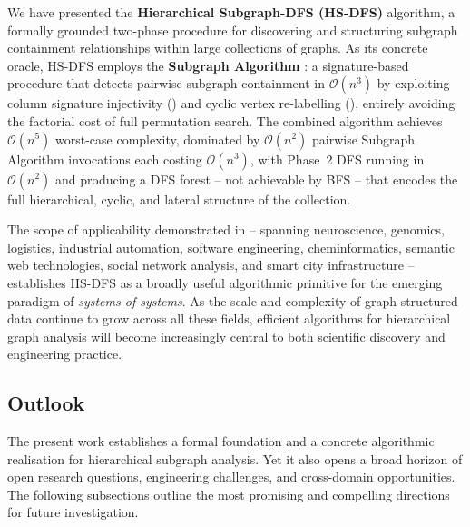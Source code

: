 ﻿\documentclass[12pt,a4paper]{article}
\theoremstyle{plain}
\theoremstyle{definition}
\theoremstyle{remark}
\begin{document}
	We have presented the \textbf{Hierarchical Subgraph-DFS (HS-DFS)} algorithm,
	a formally grounded two-phase procedure for discovering and structuring
	subgraph containment relationships within large collections of graphs.
	As its concrete oracle, HS-DFS employs the \textbf{Subgraph Algorithm}
	\cite{epp2026subgraph}: a signature-based procedure that detects pairwise
	subgraph containment in $\mathcal{O}(n^3)$ by exploiting column signature
	injectivity () and cyclic vertex re-labelling
	(), entirely avoiding the factorial cost of full
	permutation search.  The combined algorithm achieves $\mathcal{O}(n^5)$
	worst-case complexity, dominated by $\mathcal{O}(n^2)$ pairwise Subgraph
	Algorithm invocations each costing $\mathcal{O}(n^3)$,
	with Phase~2 DFS running in $\mathcal{O}(n^2)$ and producing a DFS
	forest -- not achievable by BFS -- that encodes the full hierarchical, cyclic,
	and lateral structure of the collection.
	
	The scope of applicability demonstrated in  -- spanning
	neuroscience, genomics, logistics, industrial automation, software engineering,
	cheminformatics, semantic web technologies, social network analysis, and smart
	city infrastructure -- establishes HS-DFS as a broadly useful algorithmic
	primitive for the emerging paradigm of \emph{systems of systems}.  As
	the scale and complexity of graph-structured data continue to grow across
	all these fields, efficient algorithms for hierarchical graph analysis will
	become increasingly central to both scientific discovery and engineering
	practice.

	\subsection{Outlook}
	\label{sec:outlook}

	The present work establishes a formal foundation and a concrete algorithmic
	realisation for hierarchical subgraph analysis.  Yet it also opens a broad
	horizon of open research questions, engineering challenges, and cross-domain
	opportunities.  The following subsections outline the most promising and
	compelling directions for future investigation.

\end{document}
